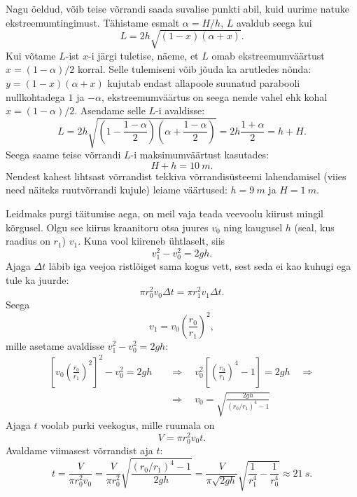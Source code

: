 \documentclass[10pt, twoside]{article}
\begin{document}
{Nagu öeldud, võib teise võrrandi saada suvalise punkti abil, kuid uurime natuke ekstreemumtingimust. Tähistame esmalt $\alpha = H/h$, $L$ avaldub seega kui
\[
L=2 h \sqrt{(1-x)(\alpha+x)}.
\]
Kui võtame $L$-ist $x$-i järgi tuletise, näeme, et $L$ omab ekstreemumväärtust $x = (1 - \alpha )/2$ korral. Selle tulemiseni võib jõuda ka arutledes nõnda: $y = (1-x)(\alpha +x)$ kujutab endast allapoole suunatud parabooli nullkohtadega $1$ ja $-\alpha$, ekstreemumväärtus on seega nende vahel ehk kohal $x = (1 - \alpha )/2$. Asendame selle $L$-i avaldisse:
\[
L=2 h \sqrt{\left(1-\frac{1-\alpha}{2}\right)\left(\alpha+\frac{1-\alpha}{2}\right)}=2 h \frac{1+\alpha}{2}=h+H.
\]
Seega saame teise võrrandi $L$-i maksimumväärtust kasutades:
\[
H + h = \SI{10}{m}.
\]
Nendest kahest lihtsast võrrandist tekkiva võrrandisüsteemi lahendamisel (viies need näiteks ruutvõrrandi kujule) leiame väärtused: $h = \SI{9}{m}$ ja $H = \SI{1}{m}$.
\probend
\bigskip


\solu
Leidmaks purgi täitumise aega, on meil vaja teada veevoolu kiirust mingil kõrgusel. Olgu see kiirus kraanitoru otsa juures $v_0$ ning kaugusel $h$ (seal, kus raadius on $r_1$) $v_1$. Kuna vool kiireneb ühtlaselt, siis
\[
v_1^2 - v_0^2 = 2gh.
\]
Ajaga $\Delta t$ läbib iga veejoa ristlõiget sama kogus vett, sest seda ei kao kuhugi ega tule ka juurde:
\[
\pi r_0^2 v_0\Delta t = \pi r_1^2 v_1\Delta t.
\]
Seega
\[
v_1 = v_0 \left(\frac{r_0}{r_1}\right)^2,
\]
mille asetame avaldisse $v_1^2-v_0^2=2gh$:
\[
\begin{aligned}
\left[v_{0}\left(\frac{r_{0}}{r_{1}}\right)^{2}\right]^{2}-v_{0}^{2}=2 g h \quad&\Rightarrow\quad v_{0}^{2}\left[\left(\frac{r_{0}}{r_{1}}\right)^{4}-1\right]=2 g h \quad\Rightarrow\\
&\Rightarrow \quad v_{0}=\sqrt{\frac{2 g h}{\left(r_{0} / r_{1}\right)^{4}-1}}
\end{aligned}
\]
Ajaga $t$ voolab purki veekogus, mille ruumala on
\[
V = \pi r_0^2 v_0t.
\]
Avaldame viimasest võrrandist aja $t$:
\[
t=\frac{V}{\pi r_{0}^{2} v_{0}}=\frac{V}{\pi r_{0}^{2}} \sqrt{\frac{\left(r_{0} / r_{1}\right)^{4}-1}{2 g h}} = \frac{V}{\pi \sqrt{2 g h}} \sqrt{\frac{1}{r_{1}^{4}}-\frac{1}{r_{0}^{4}}}\approx \SI{21}{s}.
\]
\probend
\bigskip


}
\end{document}
